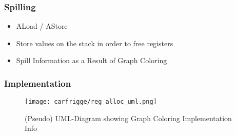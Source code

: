 \begin{frame}
    \frametitle{Spilling}
    \begin{itemize}
        \item ALoad / AStore
        \item Store values on the stack in order to free registers
        \item Spill Information as a Result of Graph Coloring
    \end{itemize}
\end{frame}

\begin{frame}
    \frametitle{Implementation}
  \begin{figure}
  \texttt{[image: carfrigge/reg\_alloc\_uml.png]}
  \caption{\small (Pseudo) UML-Diagram showing Graph Coloring Implementation Info}
  \end{figure}
\end{frame}
